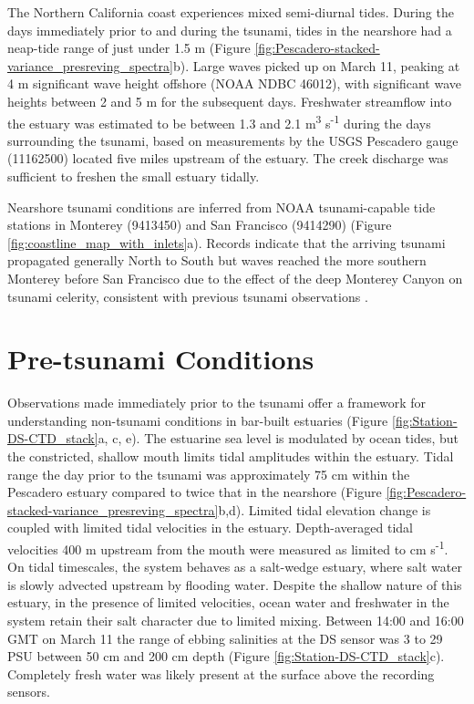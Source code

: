 The Northern California coast experiences mixed semi-diurnal tides.
During the days immediately prior to and during the tsunami, tides
in the nearshore had a neap-tide range of just under 1.5 m
(Figure \ref{fig:Pescadero-stacked-variance_presreving_spectra}b).
Large waves picked up on March 11, peaking at 4 m significant wave
height offshore (NOAA NDBC 46012), with significant wave heights between
2 and 5 m for the subsequent days. Freshwater streamflow into
the estuary was estimated to be between 1.3 and 2.1 m\textsuperscript{3}
s\textsuperscript{-1} during the days surrounding the tsunami, based on measurements by the USGS Pescadero
gauge (11162500) located five miles upstream of the estuary. The creek discharge was sufficient to freshen the small estuary tidally. 

Nearshore tsunami conditions are inferred from NOAA tsunami-capable
tide stations in Monterey (9413450) and San Francisco (9414290) (Figure
\ref{fig:coastline_map_with_inlets}a). Records indicate that the
arriving tsunami propagated generally North to South but waves reached
the more southern Monterey before San Francisco due to the effect
of the deep Monterey Canyon on tsunami celerity, consistent with previous
tsunami observations \parencite{gonzalez_edge_1995}. 


\section{Pre-tsunami Conditions}

Observations made immediately prior to the tsunami offer a framework
for understanding non-tsunami conditions in bar-built estuaries (Figure
\ref{fig:Station-DS-CTD_stack}a, c, e). The estuarine sea level is
modulated by ocean tides, but the constricted, shallow mouth limits
tidal amplitudes within the estuary. Tidal range the day prior to
the tsunami was approximately 75 cm within the Pescadero estuary compared
to twice that in the nearshore (Figure \ref{fig:Pescadero-stacked-variance_presreving_spectra}b,d).
Limited tidal elevation change is coupled with limited tidal velocities
in the estuary. Depth-averaged tidal velocities 400 m upstream from
the mouth were measured as limited to  cm s\textsuperscript{-1}.
On tidal timescales, the system behaves as a salt-wedge estuary, where
salt water is slowly advected upstream by flooding water. Despite
the shallow nature of this estuary, in the presence of limited velocities,
ocean water and freshwater in the system retain their salt character
due to limited mixing. Between 14:00 and 16:00 GMT on March 11 the
range of ebbing salinities at the DS sensor was 3 to 29 PSU between
50 cm and 200 cm depth (Figure \ref{fig:Station-DS-CTD_stack}c).
Completely fresh water was likely present at the surface above the
recording sensors. 



